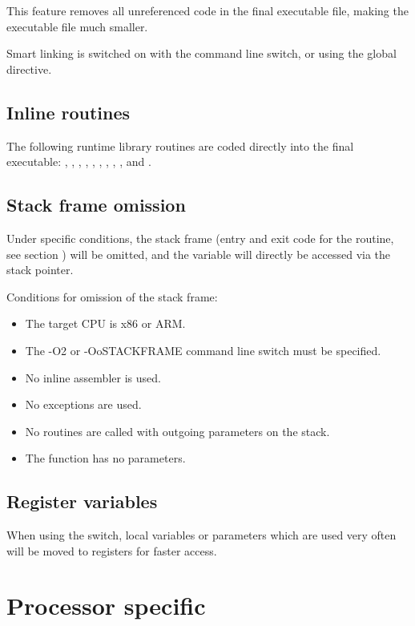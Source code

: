 This feature removes all unreferenced code in the final executable
file, making the executable file much smaller.

Smart linking is switched on with the  command line switch, or
using the  global directive.

\subsection{Inline routines}

The following runtime library routines are coded directly into the
final executable: , , , ,
, , , , ,
 and .

\subsection{Stack frame omission}

Under specific conditions, the stack frame (entry and exit code for
the routine, see section ) will be omitted, and the
variable will directly be accessed via the stack pointer.

Conditions for omission of the stack frame:
\begin{itemize}
\item The target CPU is x86 or ARM.
\item The -O2 or -OoSTACKFRAME command line switch must be specified.
\item No inline assembler is used.
\item No exceptions are used.
\item No routines are called with outgoing parameters on the stack.
\item The function has no parameters.
\end{itemize}

\subsection{Register variables}

When using the  switch, local variables or parameters
which are used very often will be moved to registers for faster
access.

\section{Processor specific}

